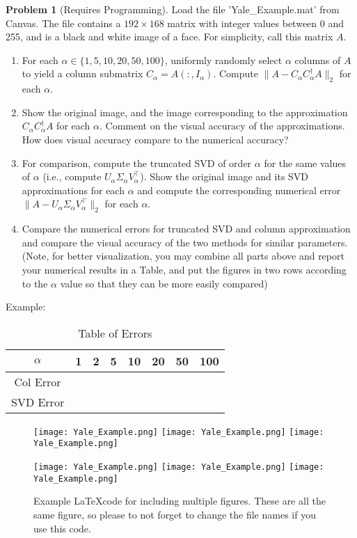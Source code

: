 \documentclass{amsart}[11pt]
\theoremstyle{definition}
\newtheorem{problem}{Problem}
\begin{document}
\begin{problem}[Requires Programming]
Load the file 'Yale{\_}Example.mat' from Canvas. The file contains a $192\times 168$ matrix with integer values between 0 and 255, and is a black and white image of a face.  For simplicity, call this matrix $A$.
\begin{enumerate}
\item For each $\alpha \in \{1, 5, 10, 20, 50, 100\}$, uniformly randomly select $\alpha$ columns of $A$ to yield a column submatrix $C_\alpha=A(:,I_\alpha)$.  Compute $\|A-C_\alpha C_\alpha^\dagger A\|_2$ for each $\alpha$.
\item Show the original image, and the image corresponding to the approximation $C_\alpha C_\alpha^\dagger A$ for each $\alpha$. Comment on the visual accuracy of the approximations.  How does visual accuracy compare to the numerical accuracy?
\item For comparison, compute the truncated SVD of order $\alpha$ for the same values of $\alpha$ (i.e., compute $U_\alpha\Sigma_\alpha V_\alpha^{\top}$).  Show the original image and its SVD approximations for each $\alpha$ and compute the corresponding numerical error $\|A-U_\alpha\Sigma_\alpha V_\alpha^{\top}\|_2$ for each $\alpha$.
\item Compare the numerical errors for truncated SVD and column approximation and compare the visual accuracy of the two methods for similar parameters. (Note, for better visualization, you may combine all parts above and report your numerical results in a Table, and put the figures in two rows according to the $\alpha$ value so that they can be more easily compared)
\end{enumerate}
\end{problem}

Example:

\begin{table}[H]
\begin{tabular}{|c||c|c|c|c|c|c|c|}
\hline
$\alpha$ & 1 & 2 & 5 & 10 & 20 & 50 & 100\\
\hline
Col Error & & & & & & & \\
\hline
SVD Error & & & & & & & \\
\hline
\end{tabular}\caption{Table of Errors}
\end{table}

\begin{figure}[ht]
\centering
\mbox{\texttt{[image: Yale\_Example.png]}} \hfill
\mbox{\texttt{[image: Yale\_Example.png]}} \hfill
\mbox{\texttt{[image: Yale\_Example.png]}} 

\mbox{\texttt{[image: Yale\_Example.png]}} \hfill
\mbox{\texttt{[image: Yale\_Example.png]}} \hfill
\mbox{\texttt{[image: Yale\_Example.png]}} 

\caption{Example \LaTeX code for including multiple figures.  These are all the same figure, so please to not forget to change the file names if you use this code.}  
\vspace{-0.05in}
\end{figure}
\end{document}
